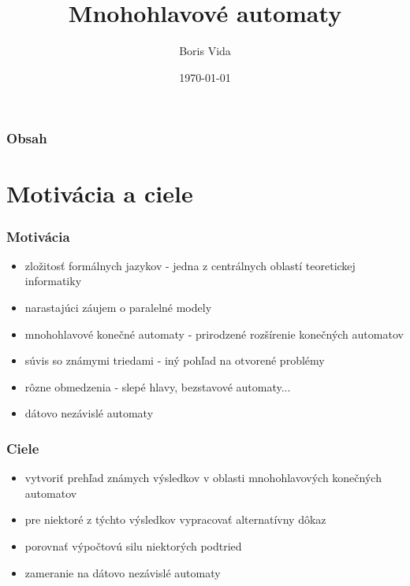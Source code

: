 \documentclass[slovak]{beamer}
\title[Mnohohlavové automaty]{Mnohohlavové automaty}
\author{Boris Vida}
\institute[FMFI UK]
{
Katedra informatiky, FMFI UK \\
\medskip
\textit{Prof. RNDr. Pavol Ďuriš, CsC.}
}
\date{\today}
\begin{document}
\begin{frame}
\titlepage %
\end{frame}

\begin{frame}
\frametitle{Obsah}
\tableofcontents
\end{frame}

\section{Motivácia a ciele}

\begin{frame}
\frametitle{Motivácia}

\begin{itemize}
\item zložitosť formálnych jazykov - jedna z centrálnych oblastí teoretickej informatiky
\item narastajúci záujem o paralelné modely
\item mnohohlavové konečné automaty - prirodzené rozšírenie konečných automatov
\item súvis so známymi triedami - iný pohľad na otvorené problémy
\item rôzne obmedzenia - slepé hlavy, bezstavové automaty...
\item dátovo nezávislé automaty
\end{itemize}

\end{frame}

\begin{frame}
\frametitle{Ciele}

\begin{itemize}
\item vytvoriť prehľad známych výsledkov v oblasti mnohohlavových konečných automatov
\item pre niektoré z týchto výsledkov vypracovať alternatívny dôkaz
\item porovnať výpočtovú silu niektorých podtried
\item zameranie na dátovo nezávislé automaty
\end{itemize}

\end{frame}

\end{document}
